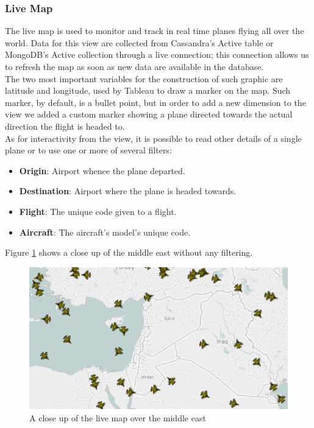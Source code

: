\subsubsection{Live Map}
The live map is used to monitor and track in real time planes flying all over the world. Data for this view are collected from Cassandra's Active table or MongoDB's Active collection through a live connection; this connection allows us to refresh the map as soon as new data are available in the database.
\\
The two most important variables for the construction of such graphic are latitude and longitude, used by Tableau to draw a marker on the map. Such marker, by default, is a bullet point, but in order to add a new dimension to the view we added a custom marker showing a plane directed towards the actual direction the flight is headed to.
\\
As for interactivity from the view, it is possible to read other details of a single plane or to use one or more of several filters:
\begin{itemize}
	\item \textbf{Origin}: Airport whence the plane departed.
	\item \textbf{Destination}: Airport where the plane is headed towards.
	\item \textbf{Flight}: The unique code given to a flight.
	\item \textbf{Aircraft}: The aircraft's model's unique code.
\end{itemize}

Figure \ref{fig:LiveMap} shows a close up of the middle east without any filtering.
\begin{figure}[h]
	\centering
	\includegraphics[width=0.9\linewidth]{Figures/LiveMap.png}
	\caption{A close up of the live map over the middle east}
	\label{fig:LiveMap}
\end{figure}

